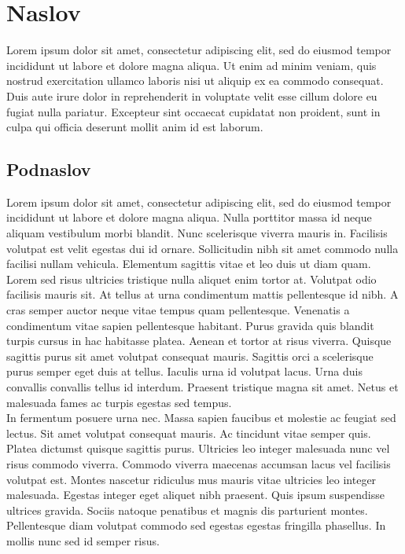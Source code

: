 
\section{Naslov}

Lorem ipsum dolor sit amet, consectetur adipiscing elit, sed do eiusmod tempor incididunt ut labore et dolore magna aliqua. Ut enim ad minim veniam, quis nostrud exercitation ullamco laboris nisi ut aliquip ex ea commodo consequat. Duis aute irure dolor in reprehenderit in voluptate velit esse cillum dolore eu fugiat nulla pariatur. Excepteur sint occaecat cupidatat non proident, sunt in culpa qui officia deserunt mollit anim id est laborum.

\subsection{Podnaslov}

Lorem ipsum dolor sit amet, consectetur adipiscing elit, sed do eiusmod tempor incididunt ut labore et dolore magna aliqua. Nulla porttitor massa id neque aliquam vestibulum morbi blandit. Nunc scelerisque viverra mauris in. Facilisis volutpat est velit egestas dui id ornare. Sollicitudin nibh sit amet commodo nulla facilisi nullam vehicula. Elementum sagittis vitae et leo duis ut diam quam. Lorem sed risus ultricies tristique nulla aliquet enim tortor at. Volutpat odio facilisis mauris sit. At tellus at urna condimentum mattis pellentesque id nibh. A cras semper auctor neque vitae tempus quam pellentesque. Venenatis a condimentum vitae sapien pellentesque habitant. Purus gravida quis blandit turpis cursus in hac habitasse platea. Aenean et tortor at risus viverra. Quisque sagittis purus sit amet volutpat consequat mauris. Sagittis orci a scelerisque purus semper eget duis at tellus. Iaculis urna id volutpat lacus. Urna duis convallis convallis tellus id interdum. Praesent tristique magna sit amet. Netus et malesuada fames ac turpis egestas sed tempus. \\

In fermentum posuere urna nec. Massa sapien faucibus et molestie ac feugiat sed lectus. Sit amet volutpat consequat mauris. Ac tincidunt vitae semper quis. Platea dictumst quisque sagittis purus. Ultricies leo integer malesuada nunc vel risus commodo viverra. Commodo viverra maecenas accumsan lacus vel facilisis volutpat est. Montes nascetur ridiculus mus mauris vitae ultricies leo integer malesuada. Egestas integer eget aliquet nibh praesent. Quis ipsum suspendisse ultrices gravida. Sociis natoque penatibus et magnis dis parturient montes. Pellentesque diam volutpat commodo sed egestas egestas fringilla phasellus. In mollis nunc sed id semper risus. \\

